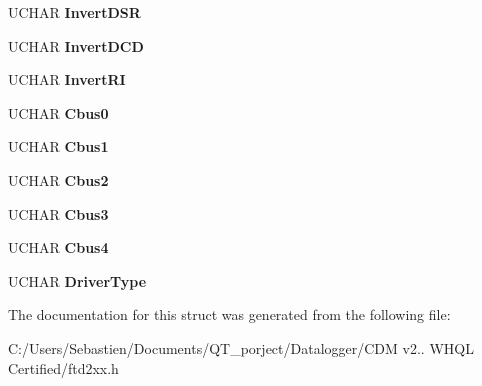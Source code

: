 \begin{DoxyCompactItemize}
U\+C\+H\+AR {\bfseries Invert\+D\+SR}
\item 
\mbox{\label{structft__eeprom__232r_a5ed1bcd1082728d070876c21c167743e}} 
U\+C\+H\+AR {\bfseries Invert\+D\+CD}
\item 
\mbox{\label{structft__eeprom__232r_a1f9d1fbebcbc86c8a27d2abf6b9169f7}} 
U\+C\+H\+AR {\bfseries Invert\+RI}
\item 
\mbox{\label{structft__eeprom__232r_a1d81e0319e53a72bd067a3de6387f4d8}} 
U\+C\+H\+AR {\bfseries Cbus0}
\item 
\mbox{\label{structft__eeprom__232r_aa0ed7fa40a23e6e17359c1fec9dc2677}} 
U\+C\+H\+AR {\bfseries Cbus1}
\item 
\mbox{\label{structft__eeprom__232r_a697c610b8e23ae556274c34703fd0582}} 
U\+C\+H\+AR {\bfseries Cbus2}
\item 
\mbox{\label{structft__eeprom__232r_af6c591aa67f0e9ff287da8af81f7399e}} 
U\+C\+H\+AR {\bfseries Cbus3}
\item 
\mbox{\label{structft__eeprom__232r_a390714a332684ea05618238e7388773f}} 
U\+C\+H\+AR {\bfseries Cbus4}
\item 
\mbox{\label{structft__eeprom__232r_a43812e19d6119e277b91f10e8db8b651}} 
U\+C\+H\+AR {\bfseries Driver\+Type}
\end{DoxyCompactItemize}


The documentation for this struct was generated from the following file\+:\begin{DoxyCompactItemize}
\item 
C\+:/\+Users/\+Sebastien/\+Documents/\+Q\+T\+\_\+porject/\+Datalogger/\+C\+D\+M v2.. W\+H\+Q\+L Certified/ftd2xx.\+h\end{DoxyCompactItemize}
